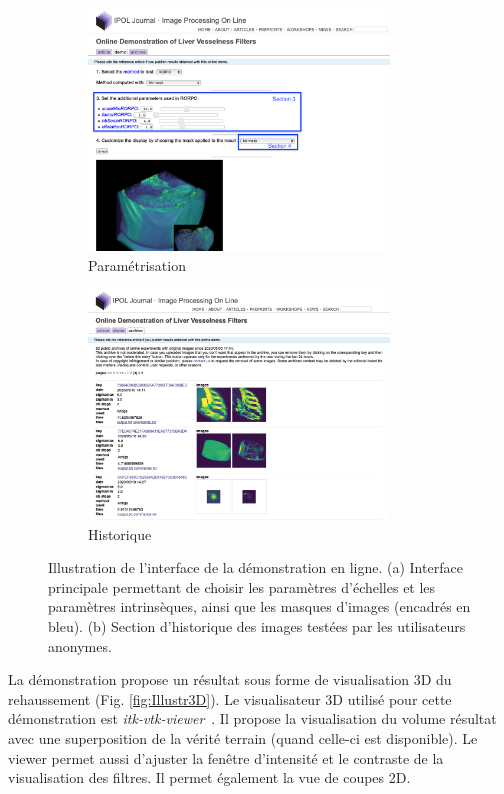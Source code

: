 \begin{figure}[!ht]
    \begin{subfigure}{0.45\textwidth}
        \centering
        \includegraphics[width=8cm]{Images/visuBenchmarkDemos.png}
        \caption{Paramétrisation}
    \end{subfigure}
    \begin{subfigure}{0.45\textwidth}
        \centering
        \includegraphics[width=8cm]{Images/visuBenchmarkDemosArchivesTrim.png}
        \caption{Historique}
    \end{subfigure}
    \caption{Illustration de l'interface de la démonstration en ligne. (a) Interface principale permettant de choisir les paramètres d'échelles et les paramètres intrinsèques, ainsi que les masques d'images (encadrés en bleu). (b) Section d'historique des images testées par les utilisateurs anonymes.}
    \label{fig:DemoExample}
\end{figure}

La démonstration propose un résultat sous forme de visualisation 3D du rehaussement (Fig. \ref{fig:Illustr3D}). Le visualisateur 3D utilisé pour cette démonstration est \textit{itk-vtk-viewer}~\cite{Mccormick2020_Visu3DDemo}. Il propose la visualisation du volume résultat avec une superposition de la vérité terrain (quand celle-ci est disponible). Le viewer permet aussi d'ajuster la fenêtre d'intensité et le contraste de la visualisation des filtres. Il permet également la vue de coupes 2D.

